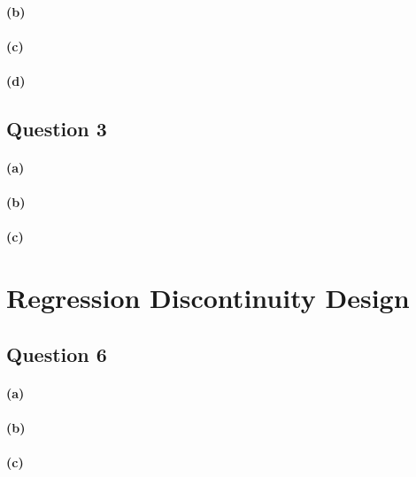 \documentclass{scrartcl}
\begin{document}


\paragraph*{(b)}


\paragraph*{(c)}

\paragraph*{(d)}

\subsection*{Question 3}

\paragraph*{(a)}

\paragraph*{(b)}

\paragraph*{(c)}

\section*{Regression Discontinuity Design}

\subsection*{Question 6}

\paragraph*{(a)}

\paragraph*{(b)}

\paragraph*{(c)}
\end{document}
